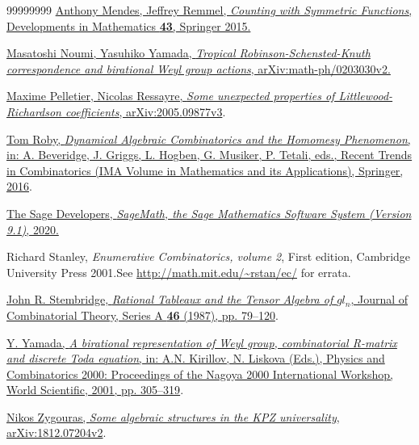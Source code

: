 \documentclass[numbers=enddot,12pt,final,onecolumn,notitlepage]{scrartcl}%
\theoremstyle{definition}
\begin{document}
\begin{thebibliography}{99999999}
%
\href{https://doi.org/10.1007/978-3-319-23618-6}{Anthony Mendes, Jeffrey
Remmel, \textit{Counting with Symmetric Functions}, Developments in
Mathematics \textbf{43}, Springer 2015.}

%
\href{http://arxiv.org/abs/math-ph/0203030v2}{Masatoshi Noumi, Yasuhiko
Yamada, \textit{Tropical Robinson-Schensted-Knuth correspondence and
birational Weyl group actions}, arXiv:math-ph/0203030v2.}

\href{https://arxiv.org/abs/2005.09877v3}{Maxime
Pelletier, Nicolas Ressayre, \textit{Some unexpected properties of
Littlewood-Richardson coefficients}, arXiv:2005.09877v3}.

%
\href{http://www2.math.uconn.edu/~troby/homomesyIMA2015Revised.pdf}{Tom Roby,
\textit{Dynamical Algebraic Combinatorics and the Homomesy Phenomenon}, in: A.
Beveridge, J. Griggs, L. Hogben, G. Musiker, P. Tetali, eds., Recent Trends in
Combinatorics (IMA Volume in Mathematics and its Applications), Springer,
2016}.

\href{http://www.sagemath.org}{The Sage
Developers, \textit{SageMath, the Sage Mathematics Software System (Version
9.1)}, 2020.}

Richard Stanley, \textit{Enumerative
Combinatorics, volume 2}, First edition, Cambridge University Press
2001.\newline See \url{http://math.mit.edu/~rstan/ec/} for errata.

%
\href{https://doi.org/10.1016/0097-3165(87)90077-X}{John R. Stembridge,
\textit{Rational Tableaux and the Tensor Algebra of }$gl_{n}$, Journal of
Combinatorial Theory, Series A \textbf{46} (1987), pp. 79--120}.

%
\href{https://www.worldscientific.com/doi/abs/10.1142/9789812810007_0014}{Y.
Yamada, \textit{A birational representation of Weyl group, combinatorial
R-matrix and discrete Toda equation}, in: A.N. Kirillov, N. Liskova (Eds.),
Physics and Combinatorics 2000: Proceedings of the Nagoya 2000 International
Workshop, World Scientific, 2001, pp. 305--319}.

\href{https://arxiv.org/abs/1812.07204v2}{Nikos
Zygouras, \textit{Some algebraic structures in the KPZ universality},
arXiv:1812.07204v2}.
\end{thebibliography}
\end{document}
